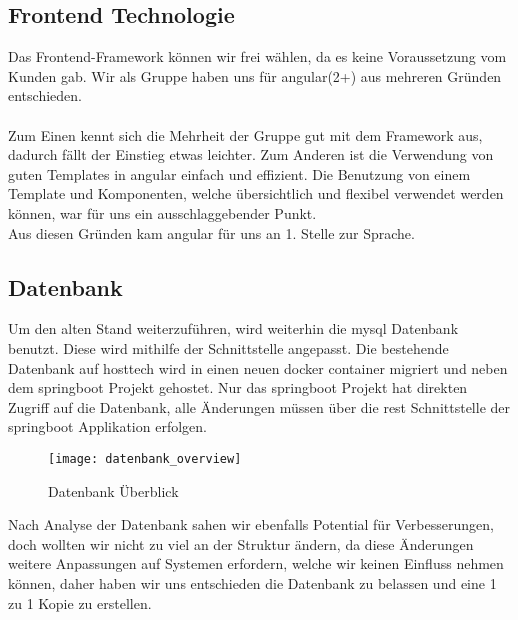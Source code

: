 \documentclass[../main.tex]{subfiles}
\begin{document}
	\subsection{Frontend Technologie}
	Das Frontend-Framework können wir frei wählen, da es keine Voraussetzung vom Kunden gab.
	Wir als Gruppe haben uns für \gls{angular}(2+) aus mehreren Gründen entschieden. \\
	\\
	Zum Einen kennt sich die Mehrheit der Gruppe gut mit dem Framework aus, dadurch fällt der Einstieg etwas leichter. Zum Anderen ist die Verwendung von guten Templates in \gls{angular} einfach und effizient. Die Benutzung von einem Template und Komponenten, welche übersichtlich und flexibel verwendet werden können, war für uns ein ausschlaggebender Punkt. \\ 
	Aus diesen Gründen kam \gls{angular} für uns an 1. Stelle zur Sprache.
	
	
	\subsection{Datenbank}
	Um den alten Stand weiterzuführen, wird weiterhin die \gls{mysql} Datenbank benutzt. Diese wird mithilfe der Schnittstelle angepasst.
	Die bestehende Datenbank auf \gls{hosttech} wird in einen neuen \gls{docker} \gls{container} migriert und neben dem \gls{springboot} Projekt gehostet. Nur das \gls{springboot} Projekt hat direkten Zugriff auf die Datenbank, alle Änderungen müssen über die \gls{rest} Schnittstelle der \gls{springboot} Applikation erfolgen.
	
	\begin{figure}[H]
		\centering
		\texttt{[image: datenbank\_overview]}
		\caption{Datenbank Überblick}
		\label{fig:datenbank_overview}
	\end{figure}
	\par
	\noindent
	Nach Analyse der Datenbank sahen wir ebenfalls Potential für Verbesserungen, doch wollten wir nicht zu viel an der Struktur ändern, da diese Änderungen weitere Anpassungen auf Systemen erfordern, welche wir keinen Einfluss nehmen können, daher haben wir uns entschieden die Datenbank zu belassen und eine 1 zu 1 Kopie zu erstellen.
\end{document}
